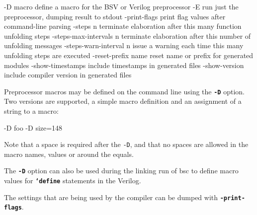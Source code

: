 \documentclass{article}
\newcommand{\te}[1]{\texttt{#1}}
\newenvironment{centerboxverbatim}
  {\center
   \boxedverbatim}
  {\endboxedverbatim
  {\endcenter }}
\begin{document}
\begin{centerboxverbatim}
-D macro                define a macro for the BSV or Verilog preprocessor
-E                      run just the preprocessor, dumping result to stdout
-print-flags            print flag values after command-line parsing
-steps n                terminate elaboration after this many function
                        unfolding steps
-steps-max-intervals n  terminate elaboration after this number of unfolding
                        messages
-steps-warn-interval n  issue a warning each time this many unfolding steps are
                        executed
-reset-prefix name      reset name or prefix for generated modules
-show-timestamps        include timestamps in generated files
-show-version           include compiler version in generated files
\end{centerboxverbatim}

Preprocessor macros may be defined on the command line using the
{\bf\tt -D} option.  Two versions are supported, a simple macro definition
and an assignment of a string to a macro:
\nopagebreak[4]
\index{-D@\te{-D} (compiler flag)}

\begin{centerboxverbatim}
-D foo
-D size=148
\end{centerboxverbatim}

Note that a space is required after the {\tt -D}, and that no spaces
are allowed in the macro names, values or around the equals.

The {\bf\tt -D} option can also be used during the linking run of bsc
to define macro values for {\bf \tt `define} statements in the Verilog.

The settings that are being used by the compiler can be dumped with
{\bf\tt -print-flags}.
\end{document}
